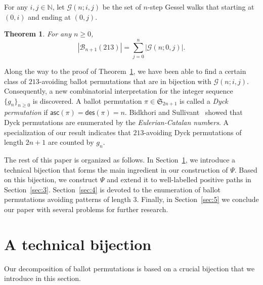 \documentclass[12pt]{amsart}
\numberwithin{equation}{section}
\theoremstyle{plain}
\newtheorem{theorem}{Theorem}[section]
\theoremstyle{definition}
\newcommand{\N}{\mathbb{N}}
\newcommand{\B}{\mathcal{B}}
\newcommand{\G}{\mathcal{G}}
\def\des{\mathsf{des}}
\def\asc{\mathsf{asc}}
\def\S{\mathfrak{S}}
\begin{document}
For any $i,j\in\N$, let $\G(n;i,j)$ be the set of  $n$-step Gessel walks that starting at $(0,i)$ and ending at $(0, j)$. 
\begin{theorem}\label{thm:213}
For any $n\geq0$, 
$$
|\B_{n+1}(213)|=\sum_{j=0}^n|\G(n;0,j)|.
$$
\end{theorem} 
Along the way to the proof of Theorem~\ref{thm:213}, we have been able to find a certain  class of $213$-avoiding ballot permutations that are in bijection with $\G(n;i,j)$. Consequently,  a new combinatorial interpretation for the integer sequence $\{g_n\}_{n\geq0}$ is discovered. A ballot permutation $\pi\in\S_{2n+1}$ is called a {\em Dyck permutation} if $\asc(\pi)=\des(\pi)=n$. 
Bidkhori and Sullivant~\cite{BS} showed that Dyck permutations are enumerated by the {\em Eulerian-Catalan numbers}.
A specialization of our result indicates that $213$-avoiding Dyck permutations of length $2n+1$ are counted by $g_n$. 

The rest of this paper is organized as follows. In Section~\ref{sec:2}, we introduce a technical bijection that forms the main ingredient in our construction of $\Psi$. Based on this bijection, we construct $\Psi$ and extend it to well-labelled positive paths in Section~\ref{sec:3}. Section~\ref{sec:4} is devoted to the enumeration of ballot permutations avoiding patterns of length $3$. Finally, in Section~\ref{sec:5} we conclude our paper with several problems for further research. 


\section{A technical bijection}
\label{sec:2}

Our decomposition of ballot permutations is based on a crucial bijection that we introduce in this section. 
\end{document}
